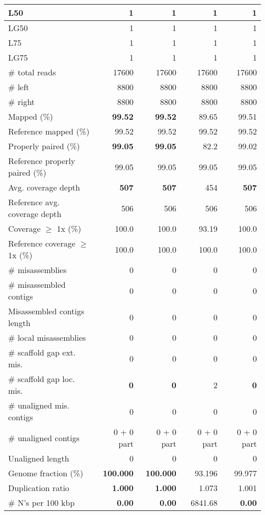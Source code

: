 \documentclass[12pt,a4paper]{article}
\begin{document}
\begin{table}[ht]
\begin{center}
\begin{tabular}{|l*{4}{|r}|}
L50 & 1 & 1 & 1 & 1 \\ \hline
LG50 & 1 & 1 & 1 & 1 \\ \hline
L75 & 1 & 1 & 1 & 1 \\ \hline
LG75 & 1 & 1 & 1 & 1 \\ \hline
\# total reads & 17600 & 17600 & 17600 & 17600 \\ \hline
\# left & 8800 & 8800 & 8800 & 8800 \\ \hline
\# right & 8800 & 8800 & 8800 & 8800 \\ \hline
Mapped (\%) & {\bf 99.52} & {\bf 99.52} & 89.65 & 99.51 \\ \hline
Reference mapped (\%) & 99.52 & 99.52 & 99.52 & 99.52 \\ \hline
Properly paired (\%) & {\bf 99.05} & {\bf 99.05} & 82.2 & 99.02 \\ \hline
Reference properly paired (\%) & 99.05 & 99.05 & 99.05 & 99.05 \\ \hline
Avg. coverage depth & {\bf 507} & {\bf 507} & 454 & {\bf 507} \\ \hline
Reference avg. coverage depth & 506 & 506 & 506 & 506 \\ \hline
Coverage $\geq$ 1x (\%) & 100.0 & 100.0 & 93.19 & 100.0 \\ \hline
Reference coverage $\geq$ 1x (\%) & 100.0 & 100.0 & 100.0 & 100.0 \\ \hline
\# misassemblies & 0 & 0 & 0 & 0 \\ \hline
\# misassembled contigs & 0 & 0 & 0 & 0 \\ \hline
Misassembled contigs length & 0 & 0 & 0 & 0 \\ \hline
\# local misassemblies & 0 & 0 & 0 & 0 \\ \hline
\# scaffold gap ext. mis. & 0 & 0 & 0 & 0 \\ \hline
\# scaffold gap loc. mis. & {\bf 0} & {\bf 0} & 2 & {\bf 0} \\ \hline
\# unaligned mis. contigs & 0 & 0 & 0 & 0 \\ \hline
\# unaligned contigs & 0 + 0 part & 0 + 0 part & 0 + 0 part & 0 + 0 part \\ \hline
Unaligned length & 0 & 0 & 0 & 0 \\ \hline
Genome fraction (\%) & {\bf 100.000} & {\bf 100.000} & 93.196 & 99.977 \\ \hline
Duplication ratio & {\bf 1.000} & {\bf 1.000} & 1.073 & 1.001 \\ \hline
\# N's per 100 kbp & {\bf 0.00} & {\bf 0.00} & 6841.68 & {\bf 0.00} \\ \hline

\end{tabular}
\end{center}
\end{table}
\end{document}
